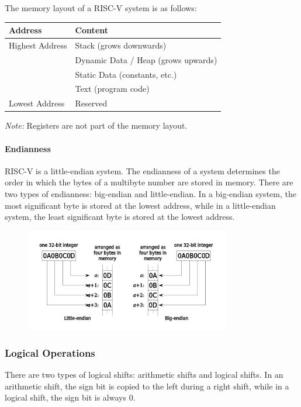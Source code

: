 \documentclass[a4paper,12pt]{article}
\begin{document}
The memory layout of a RISC-V system is as follows:

\begin{table}[H]
	\centering
	\begin{tabular}{ll}
		\toprule
		\textbf{Address} & \textbf{Content} \\
		\midrule
		Highest Address & Stack (grows downwards) \\
		& Dynamic Data / Heap (grows upwards) \\
		& Static Data (constants, etc.) \\
		& Text (program code) \\
		Lowest Address & Reserved \\
		\bottomrule
	\end{tabular}
\end{table}

\textit{Note:} Registers are not part of the memory layout.

\paragraph{Endianness} RISC-V is a little-endian system. The endianness of a system determines the order in which the bytes of a multibyte number are stored in memory. There are two types of endianness: big-endian and little-endian. In a big-endian system, the most significant byte is stored at the lowest address, while in a little-endian system, the least significant byte is stored at the lowest address. 

\begin{figure}[H]
	\centering
	\includegraphics[width=0.8\textwidth]{figure/32bit-Endianess.png}
\end{figure}

\subsubsection{Logical Operations}

There are two types of logical shifts: arithmetic shifts and logical shifts. In an arithmetic shift, the sign bit is copied to the left during a right shift, while in a logical shift, the sign bit is always 0.
\end{document}
